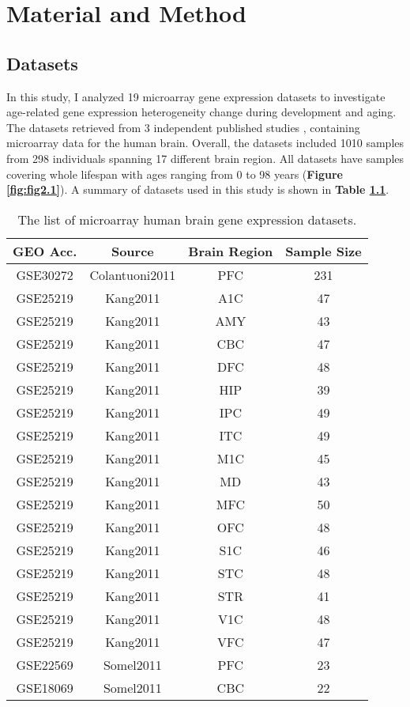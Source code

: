 \chapter{Material and Method}
\label{chp:b2}

\section{Datasets}
In this study, I analyzed 19 microarray gene expression datasets to investigate age-related gene expression heterogeneity change during development and aging.
The datasets retrieved from 3 independent published studies \cite{Colantuoni2011, Kang2011, Somel2011, Somel2010}, containing microarray data for the human brain.
Overall, the datasets included 1010 samples from 298 individuals spanning 17 different brain region. 
All datasets have samples covering whole lifespan with ages ranging from 0 to 98 years (\textbf{Figure \ref{fig:fig2.1}}).
A summary of datasets used in this study is shown in \textbf{Table \ref{table:table1}}.




\begin{table}[ht]
\centering
\caption{The list of microarray human brain gene expression datasets.}
\label{table:table1}
\begin{tabular}{|c c c c|}
 \hline
 \textbf{GEO Acc.} & \textbf{Source} & \textbf{Brain Region} & \textbf{Sample Size} \\ [0.5ex] 
 \hline\hline
 GSE30272 & Colantuoni2011 & PFC & 231 \\ 
 \hline
 GSE25219 & Kang2011 & A1C & 47 \\
 \hline
 GSE25219 & Kang2011 & AMY & 43 \\
 \hline
 GSE25219 & Kang2011 & CBC & 47 \\
 \hline
 GSE25219 & Kang2011 & DFC & 48 \\
 \hline
 GSE25219 & Kang2011 & HIP & 39 \\
 \hline
 GSE25219 & Kang2011 & IPC & 49 \\
 \hline
 GSE25219 & Kang2011 & ITC & 49 \\
 \hline
 GSE25219 & Kang2011 & M1C & 45 \\
 \hline
 GSE25219 & Kang2011 & MD & 43 \\
 \hline
 GSE25219 & Kang2011 & MFC & 50 \\
 \hline
 GSE25219 & Kang2011 & OFC & 48 \\
 \hline
 GSE25219 & Kang2011 & S1C & 46 \\
 \hline
 GSE25219 & Kang2011 & STC & 48 \\
 \hline
 GSE25219 & Kang2011 & STR & 41 \\
 \hline
 GSE25219 & Kang2011 & V1C & 48 \\
 \hline
 GSE25219 & Kang2011 & VFC & 47 \\
 \hline
 GSE22569 & Somel2011 & PFC & 23 \\
 \hline
 GSE18069 & Somel2011 & CBC & 22 \\
\hline
\end{tabular}
\end{table}

